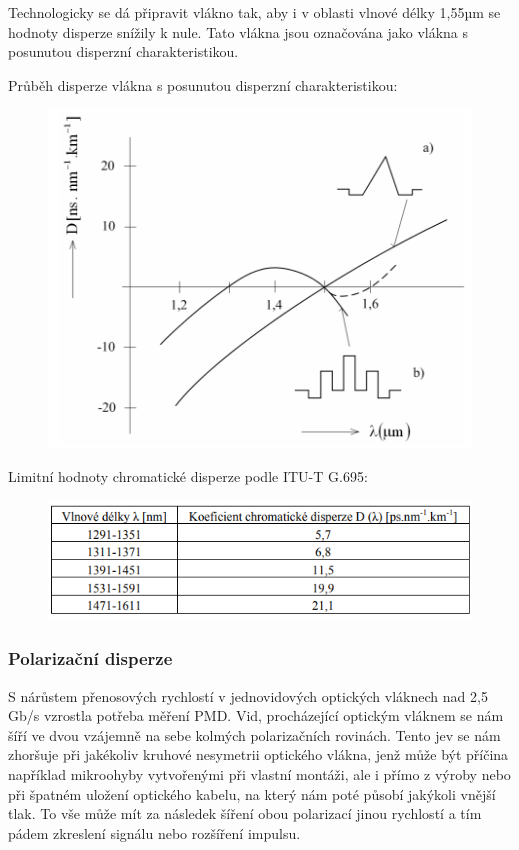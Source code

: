 Technologicky se dá připravit vlákno tak, aby i v oblasti vlnové délky 1,55µm se hodnoty disperze snížily k nule. Tato vlákna jsou označována jako vlákna s posunutou disperzní charakteristikou. \newpage

Průběh disperze vlákna s posunutou disperzní charakteristikou:
\begin{figure}[!ht]
\begin{center}
    \includegraphics[scale=1]{obrazky/chromdisp2.png}
  \end{center}
\end{figure}

Limitní hodnoty chromatické disperze podle ITU-T G.695:
\begin{figure}[!ht]
\begin{center}
    \includegraphics[scale=1]{obrazky/ITUchrom.png}
  \end{center}
\end{figure}

\subsubsection{Polarizační disperze}
S nárůstem přenosových rychlostí v jednovidových optických vláknech nad 2,5 Gb/s vzrostla potřeba měření PMD. Vid, procházející optickým vláknem se nám šíří ve dvou vzájemně na sebe kolmých polarizačních rovinách. Tento jev se nám zhoršuje při jakékoliv kruhové nesymetrii optického vlákna, jenž může být příčina například mikroohyby vytvořenými při vlastní montáži, ale i přímo z výroby nebo při špatném uložení optického kabelu, na který nám poté působí jakýkoli vnější tlak. To vše může mít za následek šíření obou polarizací jinou rychlostí a tím pádem zkreslení signálu nebo rozšíření impulsu. \newpage

